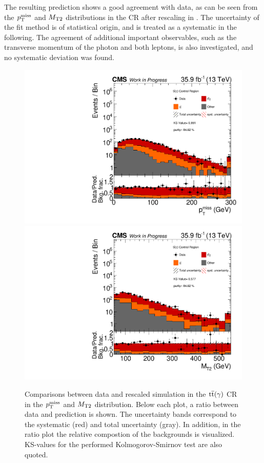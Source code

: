The resulting prediction shows a good agreement with data, as can be seen from the $p_{\mathrm{T}}^\text{miss}$ and $M_{\mathrm{T2}}$ distributions in the CR after rescaling in . The uncertainty of the fit method is of statistical origin, and is treated as a systematic in the following. The agreement of additional important observables, such as the transverse momentum of the photon and both leptons, is also investigated, and no systematic deviation was found.
\begin{figure}[tbp]
 \centering
 \includegraphics[width=\pairwidth]{figures/plots_CR_tt/CRTT_EM_nom_met_log}
 \includegraphics[width=\pairwidth]{figures/plots_CR_tt/CRTT_EM_nom_mt2_log}
 \caption{Comparisons between data and rescaled simulation in the ${\mathrm{t}\overline{\mathrm{t}}}(\gamma)$ CR in the $p_{\mathrm{T}}^\text{miss}$ and $M_{\mathrm{T2}}$ distribution. Below each plot, a ratio between data and prediction is shown. The uncertainty bands correspond to the systematic (red) and total uncertainty (gray). In addition, in the ratio plot the relative compostion of the backgrounds is visualized. KS-values for the performed Kolmogorov-Smirnov test are also quoted.}
 \label{fig:CRTT}
\end{figure}
